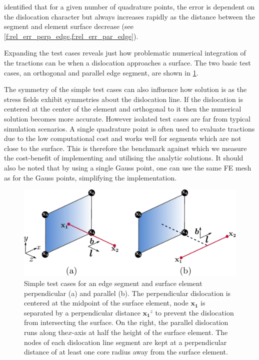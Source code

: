 \documentclass[11pt]{iopart}
\begin{document}
\citet{Queyreau} identified that for a given number of quadrature points, the error is dependent on the dislocation character but always increases rapidly as the distance between the segment and element surface decrease (see \cref{f:rel_err_perp_edge,f:rel_err_par_edge}).

Expanding the test cases reveals just how problematic numerical integration of the tractions can be when a dislocation approaches a surface. The two basic test cases, an orthogonal and parallel edge segment, are shown in \cref{f:gauss_quad_test}.

The symmetry of the simple test cases can also influence how solution is as the stress fields exhibit symmetries about the dislocation line. If the dislocation is centered at the center of the element and orthogonal to it then the numerical solution becomes more accurate. However isolated test cases are far from typical simulation scenarios. A single quadrature point is often used to evaluate tractions due to the low computational cost and works well for segments which are not close to the surface. This is therefore the benchmark against which we measure the cost-benefit of implementing and utilising the analytic solutions. It should also be noted that by using a single Gauss point, one can use the same FE mesh as for the Gauss points, simplifying the implementation.
%		
\begin{figure}
    \centering
    \includegraphics[width=0.8\linewidth]{images/test_gauss_quad.pdf}
    \caption{Simple test cases for an edge segment and surface element perpendicular (a) and parallel (b). The perpendicular dislocation is centered at the midpoint of the surface element, node $\mathbf{x_1}$ is separated by a perpendicular distance $\mathbf{x_1}^z$ to prevent the dislocation from intersecting the surface. On the right, the parallel dislocation runs along the$x$-axis at half the height of the surface element. The nodes of each dislocation line segment are kept at a perpendicular distance of at least one core radius away from the surface element.}
    \label{f:gauss_quad_test}
\end{figure}
\end{document}
